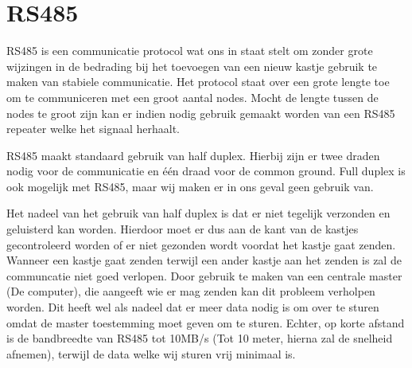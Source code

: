 \chapter{RS485}
RS485 is een communicatie protocol wat ons in staat stelt om zonder grote wijzingen in de bedrading bij het toevoegen van een nieuw kastje gebruik te maken van stabiele communicatie. Het protocol staat over een grote lengte toe om te communiceren met een groot aantal nodes. Mocht de lengte tussen de nodes te groot zijn kan er indien nodig gebruik gemaakt worden van een RS485 repeater welke het signaal herhaalt.

RS485 maakt standaard gebruik van half duplex. Hierbij zijn er twee draden nodig voor de communicatie en \'{e}\'{e}n draad voor de common ground. Full duplex is ook mogelijk met RS485, maar wij maken er in ons geval geen gebruik van.

Het nadeel van het gebruik van half duplex is dat er niet tegelijk verzonden en geluisterd kan worden. Hierdoor moet er dus aan de kant van de kastjes gecontroleerd worden of er niet gezonden wordt voordat het kastje gaat zenden. Wanneer een kastje gaat zenden terwijl een ander kastje aan het zenden is zal de communcatie niet goed verlopen. Door gebruik te maken van een centrale master (De computer), die aangeeft wie er mag zenden kan dit probleem verholpen worden. Dit heeft wel als nadeel dat er meer data nodig is om over te sturen omdat de master toestemming moet geven om te sturen. Echter, op korte afstand is de bandbreedte van RS485 tot 10MB/s (Tot 10 meter, hierna zal de snelheid afnemen), terwijl de data welke wij sturen vrij minimaal is.
